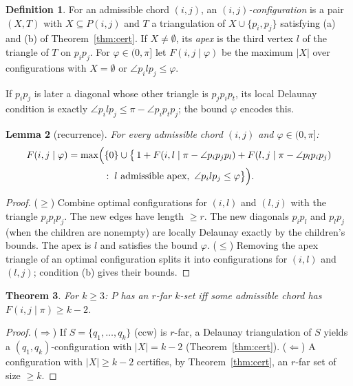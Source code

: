 \documentclass[11pt,a4paper]{article}
\newtheorem{theorem}{Theorem}
\newtheorem{lemma}[theorem]{Lemma}
\theoremstyle{definition}
\newtheorem{definition}[theorem]{Definition}
\newcommand{\arc}[2]{P(#1,#2)}
\newcommand{\ang}{\angle}
\begin{document}
\begin{definition}\label{def:F}
For an admissible chord $(i,j)$, an \emph{$(i,j)$-configuration} is a pair
$(X,T)$ with $X\subseteq\arc ij$ and $T$ a triangulation of $X\cup\{p_i,p_j\}$
satisfying (a) and (b) of Theorem~\ref{thm:cert}. If $X\ne\emptyset$, its
\emph{apex} is the third vertex $l$ of the triangle of $T$ on $p_ip_j$. For
$\varphi\in(0,\pi]$ let $F(i,j\mid\varphi)$ be the maximum $|X|$ over
configurations with $X=\emptyset$ or $\ang p_ilp_j\le\varphi$.
\end{definition}

If $p_ip_j$ is later a diagonal whose other triangle is $p_jp_ip_t$, its local
Delaunay condition is exactly $\ang p_ilp_j\le\pi-\ang p_ip_tp_j$; the bound
$\varphi$ encodes this.

\begin{lemma}[recurrence]\label{lem:rec}
For every admissible chord $(i,j)$ and $\varphi\in(0,\pi]$:
\begin{multline*}
F(i,j\mid\varphi)=\max\Bigl(\{0\}\cup\bigl\{\,1+F(i,l\mid\pi-\ang p_ip_jp_l)+F(l,j\mid\pi-\ang p_lp_ip_j)\\
 \;:\; l \text{ admissible apex},\ \ang p_ilp_j\le\varphi\bigr\}\Bigr).
\end{multline*}
\end{lemma}
\begin{proof}
($\ge$) Combine optimal configurations for $(i,l)$ and $(l,j)$ with the
triangle $p_ip_lp_j$. The new edges have length $\ge r$. The new diagonals
$p_ip_l$ and $p_lp_j$ (when the children are nonempty) are locally Delaunay
exactly by the children's bounds. The apex is $l$ and satisfies the bound
$\varphi$. ($\le$) Removing the apex triangle of an optimal configuration
splits it into configurations for $(i,l)$ and $(l,j)$; condition (b) gives
their bounds.
\end{proof}

\begin{theorem}\label{thm:decision}
For $k\ge3$: $P$ has an $r$-far $k$-set iff some admissible chord has
$F(i,j\mid\pi)\ge k-2$.
\end{theorem}
\begin{proof}
($\Rightarrow$) If $S=\{q_1,\dots,q_k\}$ (ccw) is $r$-far, a Delaunay
triangulation of $S$ yields a $(q_1,q_k)$-configuration with
$|X|=k-2$ (Theorem~\ref{thm:cert}). ($\Leftarrow$) A configuration with
$|X|\ge k-2$ certifies, by Theorem~\ref{thm:cert}, an $r$-far set of size
$\ge k$.
\end{proof}
\end{document}

